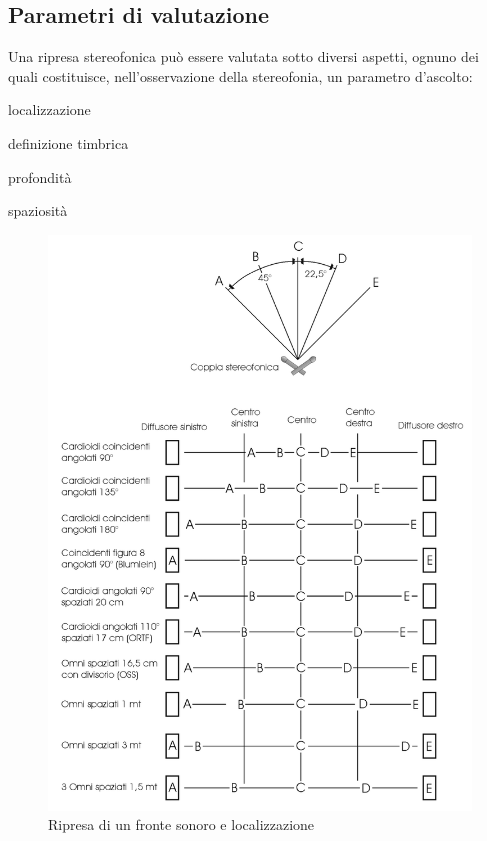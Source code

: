 \subsection{Parametri di valutazione}

Una ripresa stereofonica può essere valutata sotto diversi aspetti, ognuno dei
quali costituisce, nell'osservazione della stereofonia, un parametro d’ascolto:

\begin{compactitem}
\item localizzazione
\item definizione timbrica
\item profondità
\item spaziosità
\end{compactitem}

\begin{figure}[th]
\centering
\includegraphics[width=0.99\columnwidth]{CAPITOLI/0300/IMG/localizzazione}
\caption[]{Ripresa di un fronte sonoro e localizzazione}
\label{fig:localizzazione}
\end{figure}

